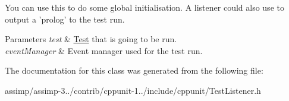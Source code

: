 You can use this to do some global initialisation. A listener could also use to output a 'prolog' to the test run.


\begin{DoxyParams}{Parameters}
{\em test} & \hyperlink{class_test}{Test} that is going to be run. \\
\hline
{\em event\+Manager} & Event manager used for the test run. \\
\hline
\end{DoxyParams}


The documentation for this class was generated from the following file\+:\begin{DoxyCompactItemize}
\item 
assimp/assimp-\/3../contrib/cppunit-\/1../include/cppunit/Test\+Listener.\+h\end{DoxyCompactItemize}
